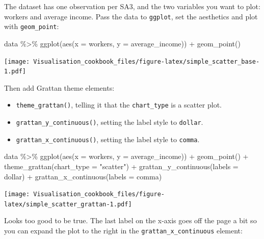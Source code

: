 \documentclass[
]{book}
\newenvironment{Shaded}{\begin{snugshade}}{\end{snugshade}}
\newcommand{\AttributeTok}[1]{\textcolor[rgb]{0.77,0.63,0.00}{#1}}
\newcommand{\FunctionTok}[1]{\textcolor[rgb]{0.00,0.00,0.00}{#1}}
\newcommand{\NormalTok}[1]{#1}
\newcommand{\SpecialCharTok}[1]{\textcolor[rgb]{0.00,0.00,0.00}{#1}}
\newcommand{\StringTok}[1]{\textcolor[rgb]{0.31,0.60,0.02}{#1}}
\providecommand{\tightlist}{%
  \setlength{\itemsep}{0pt}\setlength{\parskip}{0pt}}
\begin{document}
The dataset has one observation per SA3, and the two variables you want to plot: workers and average income. Pass the data to \texttt{ggplot}, set the aesthetics and plot with \texttt{geom\_point}:

\begin{Shaded}
\begin{Highlighting}[]
\NormalTok{data }\SpecialCharTok{\%\textgreater{}\%} 
  \FunctionTok{ggplot}\NormalTok{(}\FunctionTok{aes}\NormalTok{(}\AttributeTok{x =}\NormalTok{ workers,}
             \AttributeTok{y =}\NormalTok{ average\_income)) }\SpecialCharTok{+} 
  \FunctionTok{geom\_point}\NormalTok{()}
\end{Highlighting}
\end{Shaded}

\texttt{[image: Visualisation\_cookbook\_files/figure-latex/simple\_scatter\_base-1.pdf]}

Then add Grattan theme elements:

\begin{itemize}
\tightlist
\item
  \texttt{theme\_grattan()}, telling it that the \texttt{chart\_type} is a scatter plot.
\item
  \texttt{grattan\_y\_continuous()}, setting the label style to \texttt{dollar}.
\item
  \texttt{grattan\_x\_continuous()}, setting the label style to \texttt{comma}.
\end{itemize}

\begin{Shaded}
\begin{Highlighting}[]
\NormalTok{data }\SpecialCharTok{\%\textgreater{}\%} 
  \FunctionTok{ggplot}\NormalTok{(}\FunctionTok{aes}\NormalTok{(}\AttributeTok{x =}\NormalTok{ workers,}
             \AttributeTok{y =}\NormalTok{ average\_income)) }\SpecialCharTok{+} 
  \FunctionTok{geom\_point}\NormalTok{()  }\SpecialCharTok{+}
  \FunctionTok{theme\_grattan}\NormalTok{(}\AttributeTok{chart\_type =} \StringTok{"scatter"}\NormalTok{) }\SpecialCharTok{+} 
  \FunctionTok{grattan\_y\_continuous}\NormalTok{(}\AttributeTok{labels =}\NormalTok{ dollar) }\SpecialCharTok{+} 
  \FunctionTok{grattan\_x\_continuous}\NormalTok{(}\AttributeTok{labels =}\NormalTok{ comma)}
\end{Highlighting}
\end{Shaded}

\texttt{[image: Visualisation\_cookbook\_files/figure-latex/simple\_scatter\_grattan-1.pdf]}

Looks too good to be true. The last label on the x-axis goes off the page a bit so you can expand the plot to the right in the \texttt{grattan\_x\_continuous} element:
\end{document}
